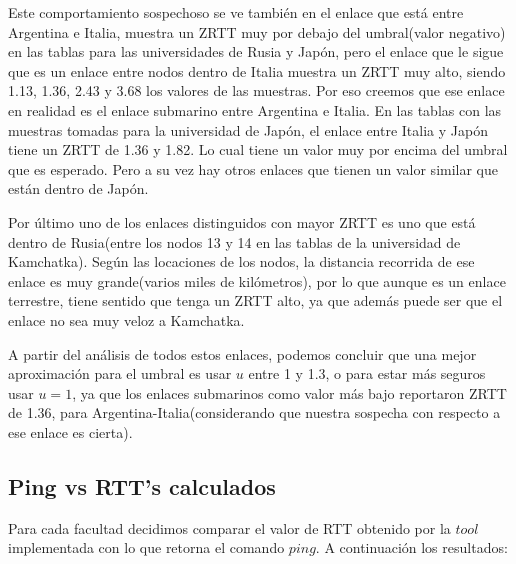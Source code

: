 Este comportamiento sospechoso se ve también en el enlace que está entre Argentina e Italia, muestra un ZRTT muy por debajo del umbral(valor negativo) en las tablas para las universidades de Rusia y Japón, pero el enlace que le sigue que es un enlace entre nodos dentro de Italia muestra un ZRTT muy alto, siendo 1.13, 1.36, 2.43 y 3.68 los valores de las muestras. Por eso creemos que ese enlace en realidad es el enlace submarino entre Argentina e Italia.
En las tablas con las muestras tomadas para la universidad de Japón, el enlace entre Italia y Japón tiene un ZRTT de 1.36 y 1.82. Lo cual tiene un valor muy por encima del umbral que es esperado. Pero a su vez hay otros enlaces que tienen un valor similar que están dentro de Japón. 

Por último uno de los enlaces distinguidos con mayor ZRTT es uno que está dentro de Rusia(entre los nodos 13 y 14 en las tablas de la universidad de Kamchatka). Según las locaciones de los nodos, la distancia recorrida de ese enlace es muy grande(varios miles de kilómetros), por lo que aunque es un enlace terrestre, tiene sentido que tenga un ZRTT alto, ya que además puede ser que el enlace no sea muy veloz a Kamchatka.

A partir del análisis de todos estos enlaces, podemos concluir que una mejor aproximación para el umbral es usar $u$ entre 1 y 1.3, o para estar más seguros usar $u=1$, ya que los enlaces submarinos como valor más bajo reportaron ZRTT de 1.36, para Argentina-Italia(considerando que nuestra sospecha con respecto a ese enlace es cierta).



\subsection{Ping vs RTT's calculados}

Para cada facultad decidimos comparar el valor de RTT obtenido por la $tool$ implementada con lo que retorna el comando $ping$. A continuación los resultados:

